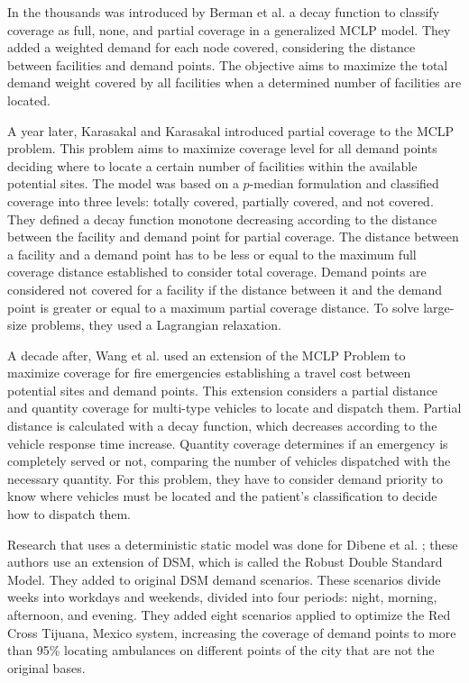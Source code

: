 In the thousands was introduced by Berman et al. \cite{berman2003gradual} a decay function to classify coverage as full, none, and partial coverage in a generalized MCLP model. They added a weighted demand for each node covered, considering the distance between facilities and demand points. The objective aims to maximize the total demand weight covered by all facilities when a determined number of facilities are located.

A year later, Karasakal and Karasakal \cite{karasakal2004maximal} introduced partial coverage to the MCLP problem. This problem aims to maximize coverage level for all demand points deciding where to locate a certain number of facilities within the available potential sites. The model was based on a $p$-median formulation and classified coverage into three levels: totally covered, partially covered, and not covered. They defined a decay function monotone decreasing according to the distance between the facility and demand point for partial coverage. The distance between a facility and a demand point has to be less or equal to the maximum full coverage distance established to consider total coverage. Demand points are considered not covered for a facility if the distance between it and the demand point is greater or equal to a maximum partial coverage distance. To solve large-size problems, they used a Lagrangian relaxation.

A decade after, Wang et al. \cite{wang2016new} used an extension of the MCLP Problem to maximize coverage for fire emergencies establishing a travel cost between potential sites and demand points. This extension considers a partial distance and quantity coverage for multi-type vehicles to locate and dispatch them. Partial distance is calculated with a decay function, which decreases according to the vehicle response time increase. Quantity coverage determines if an emergency is completely served or not, comparing the number of vehicles dispatched with the necessary quantity. For this problem, they have to consider demand priority to know where vehicles must be located and the patient's classification to decide how to dispatch them.

Research that uses a deterministic static model was done for Dibene et al. \cite{dibene2017optimizing}; these authors use an extension of DSM, which is called the Robust Double Standard Model. They added to original DSM demand scenarios. These scenarios divide weeks into workdays and weekends, divided into four periods: night, morning, afternoon, and evening. They added eight scenarios applied to optimize the Red Cross Tijuana, Mexico system, increasing the coverage of demand points to more than 95\% locating ambulances on different points of the city that are not the original bases.  

